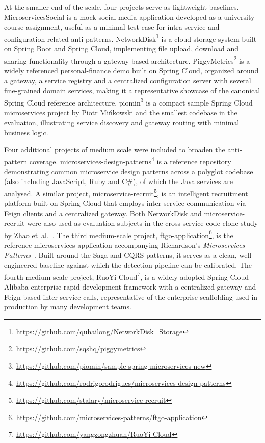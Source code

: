 \par At the smaller end of the scale, four projects serve as lightweight baselines. MicroservicesSocial is a mock social media application developed as a university course assignment, useful as a minimal test case for intra-service and configuration-related anti-patterns. NetworkDisk\footnote{\url{https://github.com/quhailong/NetworkDisk_Storage}} is a cloud storage system built on Spring Boot and Spring Cloud, implementing file upload, download and sharing functionality through a gateway-based architecture. PiggyMetrics\footnote{\url{https://github.com/sqshq/piggymetrics}} is a widely referenced personal-finance demo built on Spring Cloud, organized around a gateway, a service registry and a centralized configuration server with several fine-grained domain services, making it a representative showcase of the canonical Spring Cloud reference architecture. piomin\footnote{\url{https://github.com/piomin/sample-spring-microservices-new}} is a compact sample Spring Cloud microservices project by Piotr Mi\'nkowski and the smallest codebase in the evaluation, illustrating service discovery and gateway routing with minimal business logic.

\par Four additional projects of medium scale were included to broaden the anti-pattern coverage. microservices-design-patterns\footnote{\url{https://github.com/rodrigorodrigues/microservices-design-patterns}} is a reference repository demonstrating common microservice design patterns across a polyglot codebase (also including JavaScript, Ruby and C\#), of which the Java services are analysed. A similar project, microservice-recruit\footnote{\url{https://github.com/stalary/microservice-recruit}}, is an intelligent recruitment platform built on Spring Cloud that employs inter-service communication via Feign clients and a centralized gateway. Both NetworkDisk and microservice-recruit were also used as evaluation subjects in the cross-service code clone study by Zhao et~al.~\cite{10.1145/3524610.3527925}. The third medium-scale project, ftgo-application\footnote{\url{https://github.com/microservices-patterns/ftgo-application}}, is the reference microservices application accompanying Richardson's \textit{Microservices Patterns}~\cite{Richardson2018}. Built around the Saga and CQRS patterns, it serves as a clean, well-engineered baseline against which the detection pipeline can be calibrated. The fourth medium-scale project, RuoYi-Cloud\footnote{\url{https://github.com/yangzongzhuan/RuoYi-Cloud}}, is a widely adopted Spring Cloud Alibaba enterprise rapid-development framework with a centralized gateway and Feign-based inter-service calls, representative of the enterprise scaffolding used in production by many development teams.

